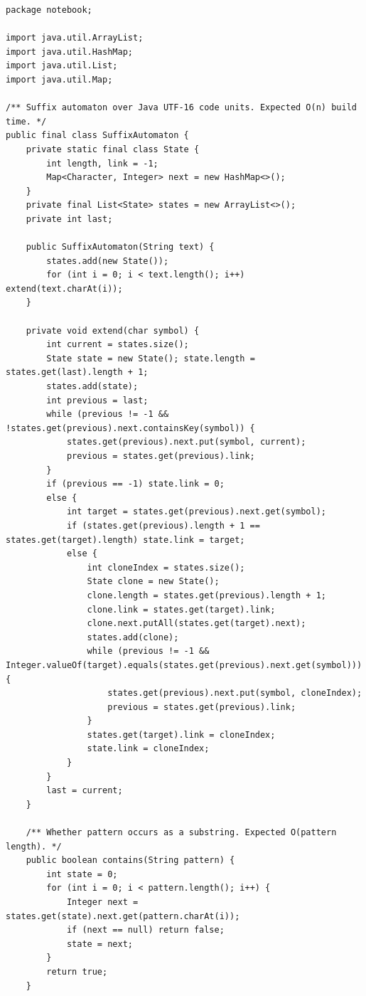 \documentclass[10pt,letterpaper]{article}
\begin{document}
\begin{lstlisting}
package notebook;

import java.util.ArrayList;
import java.util.HashMap;
import java.util.List;
import java.util.Map;

/** Suffix automaton over Java UTF-16 code units. Expected O(n) build time. */
public final class SuffixAutomaton {
    private static final class State {
        int length, link = -1;
        Map<Character, Integer> next = new HashMap<>();
    }
    private final List<State> states = new ArrayList<>();
    private int last;

    public SuffixAutomaton(String text) {
        states.add(new State());
        for (int i = 0; i < text.length(); i++) extend(text.charAt(i));
    }

    private void extend(char symbol) {
        int current = states.size();
        State state = new State(); state.length = states.get(last).length + 1;
        states.add(state);
        int previous = last;
        while (previous != -1 && !states.get(previous).next.containsKey(symbol)) {
            states.get(previous).next.put(symbol, current);
            previous = states.get(previous).link;
        }
        if (previous == -1) state.link = 0;
        else {
            int target = states.get(previous).next.get(symbol);
            if (states.get(previous).length + 1 == states.get(target).length) state.link = target;
            else {
                int cloneIndex = states.size();
                State clone = new State();
                clone.length = states.get(previous).length + 1;
                clone.link = states.get(target).link;
                clone.next.putAll(states.get(target).next);
                states.add(clone);
                while (previous != -1 && Integer.valueOf(target).equals(states.get(previous).next.get(symbol))) {
                    states.get(previous).next.put(symbol, cloneIndex);
                    previous = states.get(previous).link;
                }
                states.get(target).link = cloneIndex;
                state.link = cloneIndex;
            }
        }
        last = current;
    }

    /** Whether pattern occurs as a substring. Expected O(pattern length). */
    public boolean contains(String pattern) {
        int state = 0;
        for (int i = 0; i < pattern.length(); i++) {
            Integer next = states.get(state).next.get(pattern.charAt(i));
            if (next == null) return false;
            state = next;
        }
        return true;
    }


\end{lstlisting}
\end{document}
